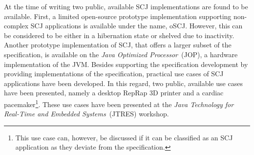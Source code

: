 At the time of writing two public, available SCJ implementations are found to be available. First, a limited open-source prototype implementation supporting non-complex SCJ applications is available under the name, oSCJ\cite{oSCJ}. However, this can be considered to be either in a hibernation state or shelved due to inactivity. Another prototype implementation of SCJ, that offers a larger subset of the specification, is available on the \textit{Java Optimized Processor}~(JOP), a hardware implementation of the JVM\cite{Schoeberl:2012:SCJonJava}. Besides supporting the specification development by providing implementations of the specification, practical use cases of SCJ applications have been developed. In this regard, two public, available use cases have been presented, namely a desktop RepRap 3D printer\cite{Schoeberl:2012:RepRap} and a cardiac pacemaker\cite{Singh:2012:CPC:2388936.2388948}\footnote{This use case can, however, be discussed if it can be classified as an SCJ application as they deviate from the specification.}. These use cases have been presented at the \textit{Java Technology for Real-Time and Embedded Systems}~(JTRES) workshop.



